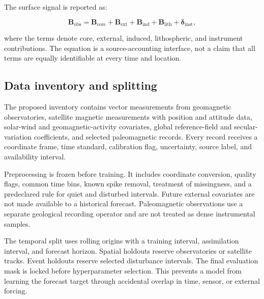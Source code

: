\documentclass[conference]{IEEEtran}
\begin{document}
The surface signal is reported as:

\begin{equation}
\mathbf{B}_{\mathrm{obs}}=\mathbf{B}_{\mathrm{core}}+\mathbf{B}_{\mathrm{ext}}+\mathbf{B}_{\mathrm{ind}}+\mathbf{B}_{\mathrm{lith}}+\boldsymbol{\delta}_{\mathrm{inst}},
\label{eq:source}
\end{equation}

where the terms denote core, external, induced, lithospheric, and instrument contributions. The equation is a source-accounting interface, not a claim that all terms are equally identifiable at every time and location.

\subsection{Data inventory and splitting}
The proposed inventory contains vector measurements from geomagnetic observatories, satellite magnetic measurements with position and attitude data, solar-wind and geomagnetic-activity covariates, global reference-field and secular-variation coefficients, and selected paleomagnetic records. Every record receives a coordinate frame, time standard, calibration flag, uncertainty, source label, and availability interval.

Preprocessing is frozen before training. It includes coordinate conversion, quality flags, common time bins, known spike removal, treatment of missingness, and a predeclared rule for quiet and disturbed intervals. Future external covariates are not made available to a historical forecast. Paleomagnetic observations use a separate geological recording operator and are not treated as dense instrumental samples.

The temporal split uses rolling origins with a training interval, assimilation interval, and forecast horizon. Spatial holdouts reserve observatories or satellite tracks. Event holdouts reserve selected disturbance intervals. The final evaluation mask is locked before hyperparameter selection. This prevents a model from learning the forecast target through accidental overlap in time, sensor, or external forcing.
\end{document}
